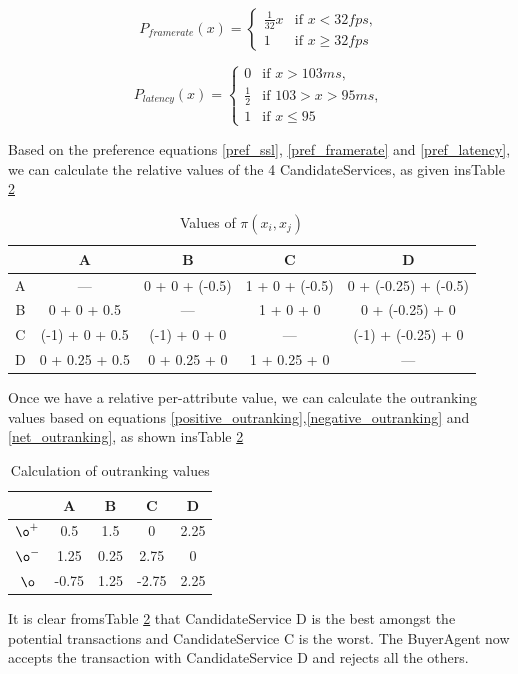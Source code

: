 \documentclass[10pt,journal,compsoc]{IEEEtran}
\begin{document}
	\begin{equation}
		P_{framerate}(x) = \begin{cases} \frac{1}{32}x &\mbox{if } x < 32fps,\\ 
										1 &\mbox{if } x \geq 32fps \end{cases}
			\label{pref_framerate}										
	\end{equation}
	
	\begin{equation}
		P_{latency}(x) = \begin{cases} 0 &\mbox{if } x > 103ms,\\ 
									   \frac{1}{2}	 &\mbox{if } 103 > x > 95ms, \\
										1 &\mbox{if } x \leq 95 \end{cases}
			\label{pref_latency}
	\end{equation}
	
Based on the preference equations \ref{pref_ssl}, \ref{pref_framerate} and \ref{pref_latency}, we can calculate the relative values of the 4 CandidateServices, as given insTable \ref{tbl:outranking_table}
	\begin{table}[htbp]
		\centering
		\caption{Values of $\pi(x_i, x_j)$ \label{tbl_ranking_values}}
		\begin{tabular}{c|cccc}
		\toprule
		  & A & B & C & D \\
		\midrule
		A & --- & 0 + 0 + (-0.5) & 1 + 0 + (-0.5) & 0 + (-0.25) + (-0.5) \\
		B & 0 + 0 + 0.5 & --- & 1 + 0 + 0 & 0 + (-0.25) + 0 \\
		C & (-1) + 0 + 0.5 & (-1) + 0 + 0 & --- & (-1) + (-0.25) + 0 \\
		D & 0 + 0.25 + 0.5 & 0 + 0.25 + 0 & 1 + 0.25 + 0 & --- \\
		\bottomrule
		\end{tabular}
	\end{table}
Once we have a relative per-attribute value, we can calculate the outranking values based on equations \ref{positive_outranking},\ref{negative_outranking} and \ref{net_outranking}, as shown insTable \ref{tbl:outranking_table}

	\begin{table}[htbp]
		\centering
		\renewcommand{\arraystretch}{1.5}
		\begin{tabular}{c|cccc}
		\toprule
		   			& A & B & C & D \\
		\midrule
			$\o^{+}$	& 0.5 & 1.5 & 0 & 2.25 \\
			$\o^{-}$	& 1.25 & 0.25 & 2.75 & 0 \\
			\hline
			$\o$		& -0.75 & 1.25 & -2.75 & 2.25 \\
		\bottomrule
		\end{tabular}			
		\caption{Calculation of outranking values \label{tbl:outranking_table}}
	\end{table}
It is clear fromsTable \ref{tbl:outranking_table} that CandidateService D is the best amongst the potential transactions and CandidateService C is the worst. The BuyerAgent now accepts the transaction with CandidateService D and rejects all the others. 
\end{document}
